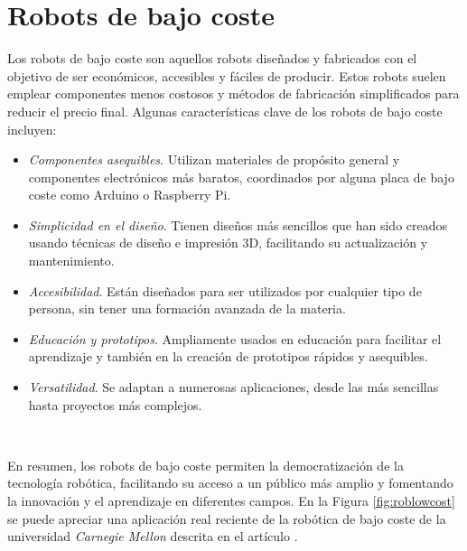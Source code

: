 \setcounter{footnote}{19} %
\setcounter{footnote}{20} %
\setcounter{footnote}{21} %


\section{Robots de bajo coste}

Los robots de bajo coste son aquellos robots diseñados y fabricados con el objetivo de ser económicos, accesibles y fáciles de producir. Estos robots suelen emplear componentes menos costosos y métodos de fabricación simplificados para reducir el precio final. Algunas características clave de los robots de bajo coste incluyen:

\begin{itemize}
	\item \textit{Componentes asequibles}. Utilizan materiales de propósito general y componentes electrónicos más baratos, coordinados por alguna placa de bajo coste como Arduino o Raspberry Pi.
	\item \textit{Simplicidad en el diseño}. Tienen diseños más sencillos que han sido creados usando técnicas de diseño e impresión 3D, facilitando su actualización y mantenimiento.
	\item \textit{Accesibilidad}. Están diseñados para ser utilizados por cualquier tipo de persona, sin tener una formación avanzada de la materia.
	\item \textit{Educación y prototipos}. Ampliamente usados en educación para facilitar el aprendizaje y también en la creación de prototipos rápidos y asequibles.
	\item \textit{Versatilidad}. Se adaptan a numerosas aplicaciones, desde las más sencillas hasta proyectos más complejos.
	
\end{itemize}\


En resumen, los robots de bajo coste permiten la democratización de la tecnología robótica, facilitando su acceso a un público más amplio y fomentando la innovación y el aprendizaje en diferentes campos. En la Figura \ref{fig:roblowcost} se puede apreciar una aplicación real reciente de la robótica de bajo coste de la universidad \textit{Carnegie Mellon} descrita en el artículo \cite{shaw2024leap}.\\ 

